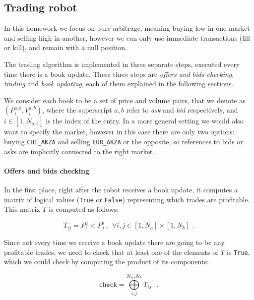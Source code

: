 \documentclass[8 pt]{article}
\begin{document}
\begin{multicols*}{2}

  \section{Trading robot}

  In this homework we focus on pure arbitrage, meaning buying low in one market and selling high in another, however we can only use immediate transactions (fill or kill), and remain with a null position.

  The trading algorithm is implemented in three separate steps, executed every time there is a book update. These three steps are \emph{offers and bids checking}, \emph{trading} and \emph{book updating}, each of them explained in the following sections.

  We consider each book to be a set of price and volume pairs, that we denote as $(P^{a,b}_i, V^{a,b}_i)$, where the superscript $a, b$ refer to \emph{ask} and \emph{bid} respectively, and $i\in [1, N_{a,b}]$ is the index of the entry. In a more general setting we would also want to specify the market, however in this case there are only two options: buying \texttt{CHI\_AKZA} and selling \texttt{EUR\_AKZA} or the opposite, so references to bids or asks are implicitly connected to the right market.

  \paragraph{Offers and bids checking}

  In the first place, right after the robot receives a book update, it computes a matrix of logical values (\texttt{True} or \texttt{False}) representing which trades are profitable. This matrix $T$ is computed as follows:

  \begin{equation*}
    T_{ij} = P^a_i < P^b_j ~,~~ \forall i,j \in [1, N_a]\times[1, N_b] ~~.
  \end{equation*}

  Since not every time we receive a book update there are going to be any profitable trades, we need to check that at least one of the elements of $T$ is \texttt{True}, which we could check by computing the product of its components:

  \begin{equation*}
    \text{\texttt{check}} = \bigoplus_{i, j}^{N_a, N_b} T_{ij} ~~,
  \end{equation*}


\end{multicols*}
\end{document}
